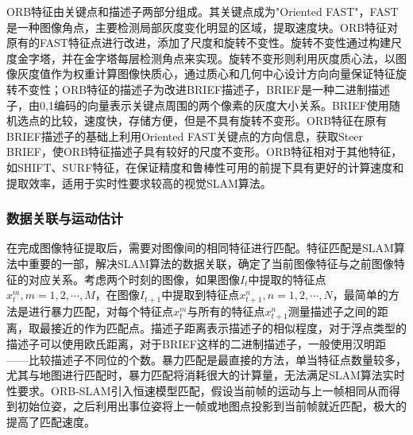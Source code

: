 ORB特征由关键点和描述子两部分组成。其关键点成为"Oriented FAST"，FAST是一种图像角点，主要检测局部灰度变化明显的区域，提取速度块。ORB特征对原有的FAST特征点进行改进，添加了尺度和旋转不变性。旋转不变性通过构建尺度金字塔，并在金字塔每层检测角点来实现。旋转不变形则利用灰度质心法，以图像灰度值作为权重计算图像快质心，通过质心和几何中心设计方向向量保证特征旋转不变性；ORB特征的描述子为改进BRIEF描述子，BRIEF是一种二进制描述子，由0,1编码的向量表示关键点周围的两个像素的灰度大小关系。BRIEF使用随机选点的比较，速度快，存储方便，但是不具有旋转不变形。ORB特征在原有BRIEF描述子的基础上利用Oriented FAST关键点的方向信息，获取Steer BRIEF，使ORB特征描述子具有较好的尺度不变形。ORB特征相对于其他特征，如SHIFT、SURF特征，在保证精度和鲁棒性可用的前提下具有更好的计算速度和提取效率，适用于实时性要求较高的视觉SLAM算法。

\subsubsection*{数据关联与运动估计}
在完成图像特征提取后，需要对图像间的相同特征进行匹配。特征匹配是SLAM算法中重要的一部，解决SLAM算法的数据关联，确定了当前图像特征与之前图像特征的对应关系。考虑两个时刻的图像，如果图像$I_t$中提取的特征点$x_t^m,m=1,2,\cdots,M$，在图像$I_{t+1}$中提取到特征点$x_{t+1}^n,n=1,2,\cdots,N$，最简单的方法是进行暴力匹配，对每个特征点$x_t^m$与所有的特征点$x_{t+1}^n$测量描述子之间的距离，取最接近的作为匹配点。描述子距离表示描述子的相似程度，对于浮点类型的描述子可以使用欧氏距离，对于BRIEF这样的二进制描述子，一般使用汉明距——比较描述子不同位的个数。暴力匹配是最直接的方法，单当特征点数量较多，尤其与地图进行匹配时，暴力匹配将消耗很大的计算量，无法满足SLAM算法实时性要求。ORB-SLAM引入恒速模型匹配，假设当前帧的运动与上一帧相同从而得到初始位姿，之后利用出事位姿将上一帧或地图点投影到当前帧就近匹配，极大的提高了匹配速度。

